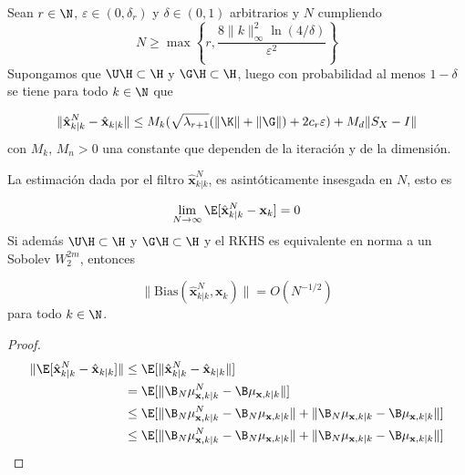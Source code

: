\begin{cor}
	Sean $r \in \N$,  $\varepsilon \in (0, \delta_r)$ y $\delta \in (0, 1)$ arbitrarios y $N$ cumpliendo
	$$N \geq \max \left \{ r, \frac{8 \| k \|_\infty^2 \ln (4/\delta)}{\varepsilon^2} \right \}$$ Supongamos que $\U \H \subset \H$ y $\G \H \subset \H$, luego con probabilidad al menos $1 - \delta$ se tiene para todo $k \in \N$ que
	
	\begin{equation*}
		\| \hat{\mathbf{x}}^N_{k|k} - \hat{\mathbf{x}}_{k|k} \| \leq M_k (\sqrt{\lambda_{r+1}} (\| \K \| + \| \G \|) + 2 c_r \varepsilon) + M_{d} \| S_X - I \|
	\end{equation*}
	con $M_k, \, M_{n} > 0$ una constante que dependen de la iteración y de la dimensión.
\end{cor}

    \begin{cor}[Sesgo]
	La estimación dada por el filtro $\hat{\mathbf{x}}^N_{k|k}$, es asintóticamente insesgada en $N$, esto es
	
	\begin{equation*}
		\lim_{N \to \infty} \E[\hat{\mathbf{x}}^N_{k|k} - \mathbf{x}_k] = 0
	\end{equation*}
	Si además $\U \H \subset \H$ y $\G \H \subset \H$ y el RKHS es equivalente en norma a un Sobolev $W_2^{2m}$, entonces
	
	\begin{equation*}
		\|\text{Bias}(\hat{\mathbf{x}}^N_{k|k}, \mathbf{x}_k)\| = O(N^{-1/2})
	\end{equation*}
	para todo $k \in \N$.
\end{cor}

\begin{proof}
	\begin{equation*}
		\begin{aligned}
			\| \E [ \hat{\mathbf{x}}^N_{k|k} - \hat{\mathbf{x}}_{k|k} ] \|  & \leq   \E [ \| \hat{\mathbf{x}}^N_{k|k} - \hat{\mathbf{x}}_{k|k} \| ] \\
		& = \E [ \| \B_N  \mu^N_{\mathbf{x}, k|k}-  \B \mu_{\mathbf{x}, k|k} \| ] \\
		& \leq \E [ \| \B_N  \mu^N_{\mathbf{x}, k|k} -  \B_N  \mu_{\mathbf{x}, k|k}\| + \|  \B_N  \mu_{\mathbf{x}, k|k}   -  \B \mu_{\mathbf{x}, k|k} \| ] \\
		& \leq \E [ \| \B_N  \mu^N_{\mathbf{x}, k|k} -  \B_N  \mu_{\mathbf{x}, k|k}\| + \|  \B_N  \mu_{\mathbf{x}, k|k}   -  \B \mu_{\mathbf{x}, k|k} \| ]
		\end{aligned}		
	\end{equation*}
	

\end{proof}

